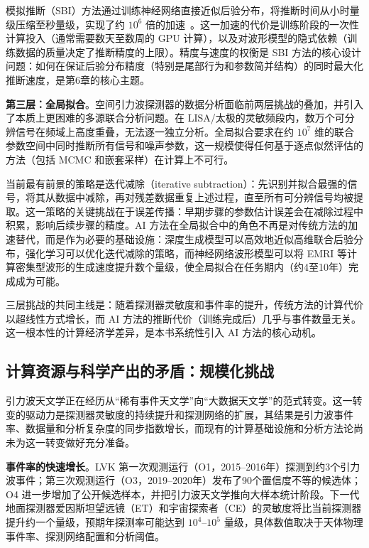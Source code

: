 模拟推断（SBI）方法通过训练神经网络直接近似后验分布，将推断时间从小时量级压缩至秒量级，实现了约 $10^6$ 倍的加速~\cite{Dax2021RNPE}。这一加速的代价是训练阶段的一次性计算投入（通常需要数天至数周的 GPU 计算），以及对波形模型的隐式依赖（训练数据的质量决定了推断精度的上限）。精度与速度的权衡是 SBI 方法的核心设计问题：如何在保证后验分布精度（特别是尾部行为和参数简并结构）的同时最大化推断速度，是第6章的核心主题。

\textbf{第三层：全局拟合}。空间引力波探测器的数据分析面临前两层挑战的叠加，并引入了本质上更困难的多源联合分析问题。在 LISA/太极的灵敏频段内，数万个可分辨信号在频域上高度重叠，无法逐一独立分析。全局拟合要求在约 $10^7$ 维的联合参数空间中同时推断所有信号和噪声参数，这一规模使得任何基于逐点似然评估的方法（包括 MCMC 和嵌套采样）在计算上不可行。

当前最有前景的策略是迭代减除（iterative subtraction）：先识别并拟合最强的信号，将其从数据中减除，再对残差数据重复上述过程，直至所有可分辨信号均被提取。这一策略的关键挑战在于误差传播：早期步骤的参数估计误差会在减除过程中积累，影响后续步骤的精度。AI 方法在全局拟合中的角色不再是对传统方法的加速替代，而是作为必要的基础设施：深度生成模型可以高效地近似高维联合后验分布，强化学习可以优化迭代减除的策略，而神经网络波形模型可以将 EMRI 等计算密集型波形的生成速度提升数个量级，使全局拟合在任务期内（约4至10年）完成成为可能。

三层挑战的共同主线是：随着探测器灵敏度和事件率的提升，传统方法的计算代价以超线性方式增长，而 AI 方法的推断代价（训练完成后）几乎与事件数量无关。这一根本性的计算经济学差异，是本书系统性引入 AI 方法的核心动机。

\subsection{计算资源与科学产出的矛盾：规模化挑战}

引力波天文学正在经历从“稀有事件天文学”向“大数据天文学”的范式转变。这一转变的驱动力是探测器灵敏度的持续提升和探测网络的扩展，其结果是引力波事件率、数据量和分析复杂度的同步指数增长，而现有的计算基础设施和分析方法论尚未为这一转变做好充分准备。

\textbf{事件率的快速增长}。LVK 第一次观测运行（O1，2015--2016年）探测到约3个引力波事件；第三次观测运行（O3，2019--2020年）发布了90个置信度不等的候选体；O4 进一步增加了公开候选样本，并把引力波天文学推向大样本统计阶段。下一代地面探测器爱因斯坦望远镜（ET）和宇宙探索者（CE）的灵敏度将比当前探测器提升约一个量级，预期年探测率可能达到 $10^4$--$10^5$ 量级，具体数值取决于天体物理事件率、探测网络配置和分析阈值。

